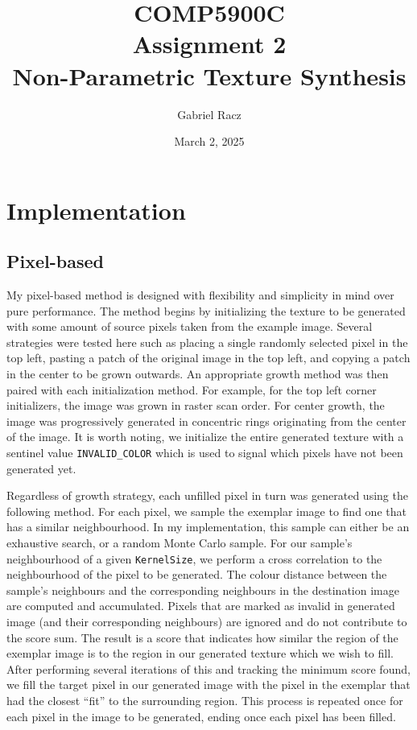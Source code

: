 \documentclass[a4paper, 11pt, titlepage]{article}
\title{COMP5900C\\
Assignment 2\\
Non-Parametric Texture Synthesis}
\author{Gabriel Racz}
\date{March 2, 2025}
\begin{document}
\maketitle
\section{Implementation}
\subsection{Pixel-based}
My pixel-based method is designed with flexibility and simplicity in mind over
pure performance. The method begins by initializing the texture to be generated
with some amount of source pixels taken from the example image. Several
strategies were tested here such as placing a single randomly selected pixel in
the top left, pasting a patch of the original image in the top left, and copying
a patch in the center to be grown outwards. An appropriate growth method was
then paired with each initialization method. For example, for the top left
corner initializers, the image was grown in raster scan order. For center growth, the image was progressively
generated in concentric rings originating from the center of the image. It is
worth noting, we initialize the entire generated texture with a sentinel value
\texttt{INVALID\_COLOR} which is used to signal which pixels have not been
generated yet.

Regardless of growth strategy, each unfilled pixel in turn was generated using
the following method. For each pixel, we sample the exemplar image to find one
that has a similar neighbourhood. In my implementation, this sample can either
be an exhaustive search, or a random Monte Carlo sample. For our sample's
neighbourhood of a given \texttt{KernelSize}, we perform a cross correlation to
the neighbourhood of the pixel to be generated. The colour distance between the
sample's neighbours and the corresponding neighbours in the destination image
are computed and accumulated. Pixels that are marked as invalid in generated
image (and their corresponding neighbours) are ignored and do not contribute to
the score sum. The result is a score that indicates how similar
the region of the exemplar image is to the region in our generated texture which
we wish to fill. After performing several iterations of this and tracking the
minimum score found, we fill the target pixel in our generated image with the
pixel in the exemplar that had the closest ``fit'' to the surrounding region.
This process is repeated once for each pixel in the image to be generated,
ending once each pixel has been filled.
\end{document}
